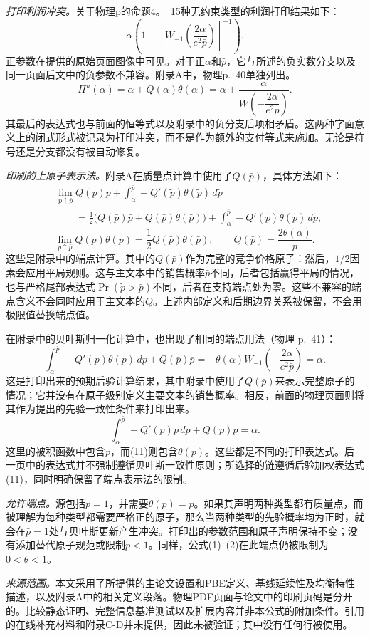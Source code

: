 \documentclass{article}
\begin{document}
\emph{打印利润冲突。}关于物理p的命题4。~15种无约束类型的利润打印结果如下：
\[
\alpha\left(
1-\left[
W_{-1}\!\left(\frac{2\alpha}{e^{2}\bar p}\right)
\right]^{-1}
\right).
\]
正参数在提供的原始页面图像中可见。对于正$\alpha$和$\bar p$，它与所述的负实数分支以及同一页面后文中的负参数不兼容。附录A中，物理p.~40单独列出。
\[
\Pi^{u}(\alpha)
 =\alpha+Q(\alpha)\theta(\alpha)
 =\alpha+\frac{\alpha}{W\!\left(-\dfrac{2\alpha}{e^{2}\bar p}\right)}.
\]
其最后的表达式也与前面的恒等式以及附录中的负分支后项相矛盾。这两种字面意义上的闭式形式被记录为打印冲突，而不是作为额外的支付等式来施加。无论是符号还是分支都没有被自动修复。

\emph{印刷的上原子表示法。}附录A在质量点计算中使用了$Q(\bar p)$，具体方法如下：
\[
\begin{aligned}
&\lim_{p\uparrow\bar p}Q(p)p
 +\int_{\alpha}^{\bar p}-Q'(\tilde p)\theta(\tilde p)\,d\tilde p\\
&\qquad=
 \frac12\bigl(Q(\bar p)\bar p+Q(\bar p)\theta(\bar p)\bigr)
 +\int_{\alpha}^{\bar p}-Q'(\tilde p)\theta(\tilde p)\,d\tilde p,
\end{aligned}
\]
\[
\lim_{p\uparrow\bar p}Q(p)\theta(p)
 =\frac12Q(\bar p)\theta(\bar p),
\qquad
Q(\bar p)=\frac{2\theta(\alpha)}{\bar p}.
\]
这些是附录中的端点计算。其中的$Q(\bar p)$作为完整的竞争价格原子：然后，$1/2$因素会应用平局规则。这与主文本中的销售概率$\bar p$不同，后者包括赢得平局的情况，也与严格尾部表达式$\Pr(\tilde p>\bar p)$不同，后者在支持端点处为零。这些不兼容的端点含义不会同时应用于主文本的$Q$。上述内部定义和后期边界关系被保留，不会用极限值替换端点值。

在附录中的贝叶斯归一化计算中，也出现了相同的端点用法（物理 p.~41）：
\begin{equation}
\int_{\alpha}^{\bar p}-Q'(p)\theta(p)\,dp
 +Q(\bar p)\bar p
 =-\theta(\alpha)
 W_{-1}\!\left(-\frac{2\alpha}{e^{2}\bar p}\right)
 =\alpha.
\tag{11}
\end{equation}
这是打印出来的预期后验计算结果，其中附录中使用了$Q(\bar p)$来表示完整原子的情况；它并没有在原子级别定义主要文本的销售概率。相反，前面的物理页面则将其作为提出的先验一致性条件来打印出来。
\[
\int_{\alpha}^{\bar p}-Q'(p)p\,dp
 +Q(\bar p)\bar p=\alpha.
\]
这里的被积函数中包含$p$，而(11)则包含$\theta(p)$。这些都是不同的打印表达式。后一页中的表达式并不强制遵循贝叶斯一致性原则；所选择的链遵循后验加权表达式(11)，同时明确保留了端点表示法的限制。

\emph{允许端点。}源包括$\bar p=1$，并需要$\theta(\bar p)=\bar p$。如果其声明两种类型都有质量点，而被理解为每种类型都需要严格正的原子，那么当两种类型的先验概率均为正时，就会在$\bar p=1$处与贝叶斯更新产生冲突。打印出的参数范围和原子声明保持不变；没有添加替代原子规范或限制$\bar p<1$。同样，公式(1)--(2)在此端点仍被限制为$0<\theta<1$。

\medskip
\noindent\emph{来源范围。}本文采用了所提供的主论文设置和PBE定义、基线延续性及均衡特性描述，以及附录A中的相关定义段落。物理PDF页面与论文中的印刷页码是分开的。比较静态证明、完整信息基准测试以及扩展内容并非本公式的附加条件。引用的在线补充材料和附录C-D并未提供，因此未被验证；其中没有任何行被使用。
\end{document}
